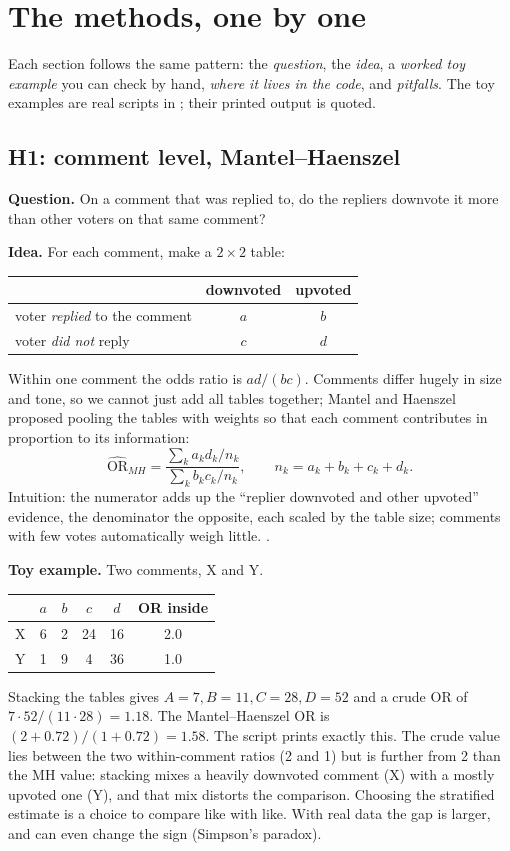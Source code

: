 \chapter{The methods, one by one}\label{ch:methods}

Each section follows the same pattern: the \emph{question}, the \emph{idea}, a \emph{worked toy example} you can check by hand, \emph{where it lives in the code}, and \emph{pitfalls}. The toy examples are real scripts in ; their printed output is quoted.

\section{H1: comment level, Mantel--Haenszel}\label{sec:h1}

\textbf{Question.} On a comment that was replied to, do the repliers downvote it more than other voters on that same comment?

\textbf{Idea.} For each comment, make a $2\times2$ table:
\begin{center}
\begin{tabular}{@{}l c c@{}}
\toprule
 & downvoted & upvoted \\
\midrule
voter \emph{replied} to the comment & $a$ & $b$ \\
voter \emph{did not} reply & $c$ & $d$ \\
\bottomrule
\end{tabular}
\end{center}
Within one comment the odds ratio is $ad/(bc)$. Comments differ hugely in size and tone, so we cannot just add all tables together; Mantel and Haenszel proposed pooling the tables with weights so that each comment contributes in proportion to its information:
\[
\widehat{\mathrm{OR}}_{MH}=\frac{\sum_k a_kd_k/n_k}{\sum_k b_kc_k/n_k},\qquad n_k=a_k+b_k+c_k+d_k .
\]
Intuition: the numerator adds up the ``replier downvoted and other upvoted'' evidence, the denominator the opposite, each scaled by the table size; comments with few votes automatically weigh little. .

\textbf{Toy example.} Two comments, X and Y.
\begin{center}
\begin{tabular}{@{}l cccc c@{}}
\toprule
 & $a$ & $b$ & $c$ & $d$ & OR inside \\
\midrule
X & 6 & 2 & 24 & 16 & 2.0 \\
Y & 1 & 9 & 4 & 36 & 1.0 \\
\bottomrule
\end{tabular}
\end{center}
Stacking the tables gives $A=7,B=11,C=28,D=52$ and a crude OR of $7\cdot52/(11\cdot28)=1.18$. The Mantel--Haenszel OR is $(2+0.72)/(1+0.72)=1.58$. The script  prints exactly this. The crude value lies between the two within-comment ratios (2 and 1) but is further from 2 than the MH value: stacking mixes a heavily downvoted comment (X) with a mostly upvoted one (Y), and that mix distorts the comparison. Choosing the stratified estimate is a choice to compare like with like. With real data the gap is larger, and can even change the sign (Simpson's paradox).

